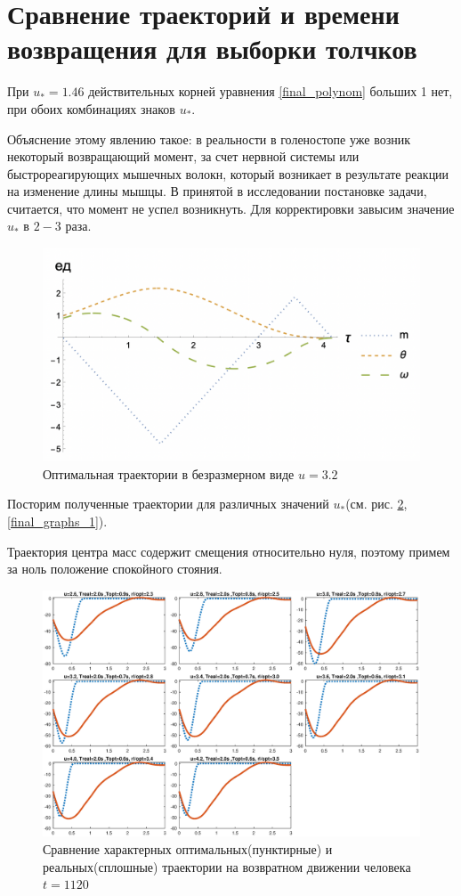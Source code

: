 \documentclass[a4paper,12pt, openany]{book}
\theoremstyle{plain} %
\theoremstyle{definition} %
\theoremstyle{remark} %
\numberwithin{equation}{chapter}
\begin{document}
{\section{Сравнение траекторий и времени возвращения для выборки толчков}


При $u_\ast=1.46$ действительных корней уравнения \eqref{final_polynom} больших 1 нет,
при обоих комбинациях знаков $u_\ast$.

Объяснение этому явлению такое: в реальности в голеностопе уже возник некоторый возвращающий момент, за счет нервной системы или быстрореагирующих мышечных волокн,
 который возникает в результате реакции на изменение длины мышцы.
В принятой в исследовании постановке задачи, считается, что момент не успел возникнуть. Для корректировки завысим значение $u_\ast$ в $2-3$ раза.

\begin{figure}[h!]
    \centering
    \includegraphics[width=0.7\linewidth]{3_graphs.png}
    \caption{Оптимальная траектории в безразмерном виде $u=3.2$ }
    \label{3_graphs}
\end{figure}

Посторим полученные траектории для различных значений $u_\ast$(см. рис. \ref{final_graphs}, \ref{final_graphs_1}).

Траектория центра масс содержит смещения относительно нуля, поэтому примем за ноль положение спокойного стояния.

\begin{figure}[h!]
    \centering
    \includegraphics[width=1\linewidth]{final_graphs.eps}
    \caption{Сравнение характерных оптимальных(пунктирные) и реальных(сплошные) траектории на возвратном движении человека $t=1120$}
    \label{final_graphs}
\end{figure}

}
\end{document}
